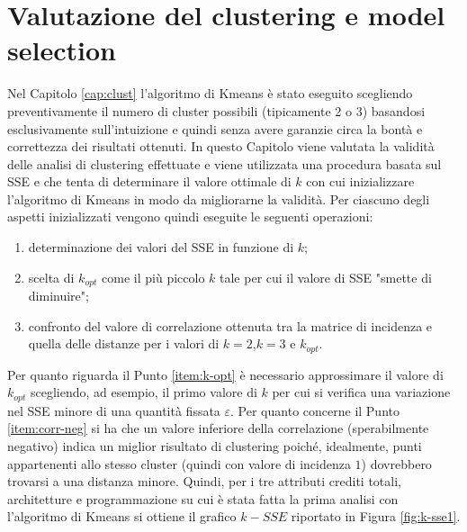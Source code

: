 \documentclass[12pt]{article}
\begin{document}
\section{Valutazione del clustering e model selection}
\label{cap:val-clust}

Nel Capitolo \ref{cap:clust} l'algoritmo di Kmeans è stato eseguito scegliendo preventivamente il numero di cluster possibili (tipicamente 2 o 3) basandosi esclusivamente sull'intuizione e quindi senza avere garanzie circa la bontà e correttezza dei risultati ottenuti. In questo Capitolo viene valutata la validità delle analisi di clustering effettuate e viene utilizzata una procedura basata sul SSE e che tenta di determinare il valore ottimale di $k$ con cui inizializzare l'algoritmo di Kmeans in modo da migliorarne la validità. Per ciascuno degli aspetti inizializzati vengono quindi eseguite le seguenti operazioni:

\begin{enumerate}
\item determinazione dei valori del SSE in funzione di $k$;
\item \label{item:k-opt} scelta di $k_{opt}$ come il più piccolo $k$ tale per cui il valore di SSE "smette di diminuire";
\item \label{item:corr-neg} confronto del valore di correlazione ottenuta tra la matrice di incidenza e quella delle distanze per i valori di $k=2$,$k=3$ e $k_{opt}$.
\end{enumerate}

Per quanto riguarda il Punto \ref{item:k-opt} è necessario approssimare il valore di $k_{opt}$ scegliendo, ad esempio, il primo valore di $k$ per cui si verifica una variazione nel SSE minore di una quantità fissata $\varepsilon$. Per quanto concerne il Punto \ref{item:corr-neg} si ha che un valore inferiore della correlazione (sperabilmente negativo) indica un miglior risultato di clustering poiché, idealmente, punti appartenenti allo stesso cluster (quindi con valore di incidenza $1$) dovrebbero trovarsi a una distanza minore. Quindi, per i tre attributi crediti totali, architetture e programmazione su cui è stata fatta la prima analisi con l'algoritmo di Kmeans si ottiene il grafico $k-SSE$ riportato in Figura \ref{fig:k-sse1}.
\end{document}
